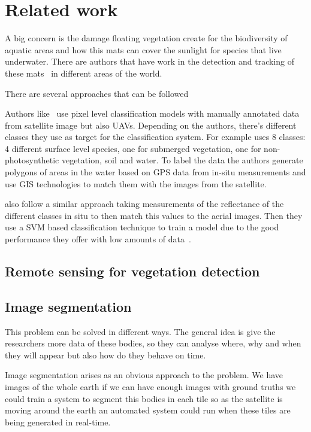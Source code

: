 \documentclass[conference]{IEEEtran}
\begin{document}
    \section{Related work}
    A big concern is the damage floating vegetation create for the biodiversity of aquatic areas and how this mats can cover the sunlight for species that live underwater.
    There are authors that have work in the detection and tracking of these mats~\cite{donyana1, donyana2,rs14133013, srilanka_veg, 10.3389/fmars.2022.1004012} in different areas of the world.

    There are several approaches that can be followed

    Authors like~\citet{srilanka_veg, 10.3389/fmars.2022.1004012} use pixel level classification models with manually annotated data from satellite image but also UAVs.
    Depending on the authors, there's different classes they use as target for the classification system.
    For example \citet{rs14133013} uses 8 classes: 4 different surface level species, one for submerged vegetation, one for non-photosynthetic vegetation, soil and water.
    To label the data the authors generate polygons of areas in the water based on GPS data from in-situ measurements and use GIS technologies to match them with the images from the satellite.

    \citet{10.3389/fmars.2022.1004012} also follow a similar approach taking measurements of the reflectance of the different classes in situ to then match this values to the aerial images.
    Then they use a SVM based classification technique to train a model due to the good performance they offer with low amounts of data~\cite{Cortes1995}.




    \subsection*{Remote sensing for vegetation detection}


    \subsection*{Image segmentation}
    This problem can be solved in different ways.
    The general idea is give the researchers more data of these bodies, so they can analyse where, why and when they will appear but also how do they
    behave on time.

    Image segmentation arises as an obvious approach to the problem.
    We have images of the whole earth if we can have enough images with ground truths we could train a system to segment this bodies in
    each tile so as the satellite is moving around the earth an automated system could run when these
    tiles are being generated in real-time.
\end{document}
